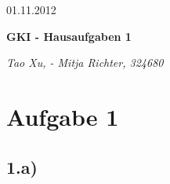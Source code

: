\documentclass[a4paper]{article}
\begin{document}
  \begin{flushright}
    01.11.2012
  \end{flushright}
  \begin{center}
    \Large\textbf{{GKI - Hausaufgaben 1}}\\
  \end{center}

  \begin{center}
        \large\textsl{Tao Xu,  - Mitja Richter, 324680}\\
  \end{center}


\section*{Aufgabe 1}
\subsection*{1.a)}
\end{document}
